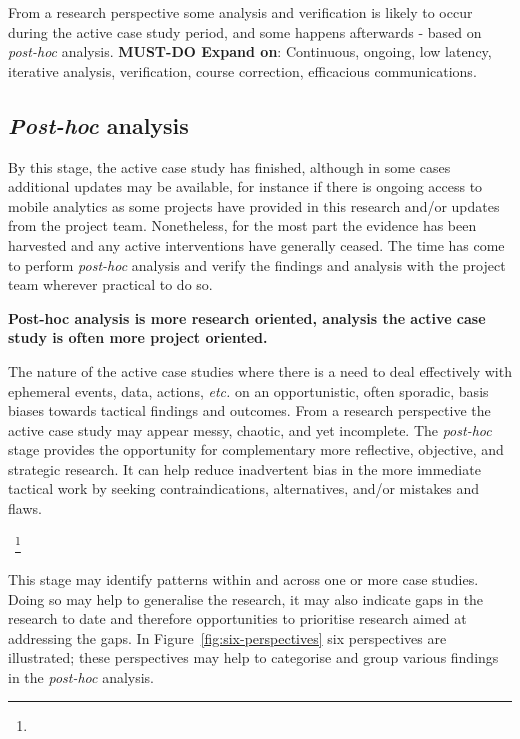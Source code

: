 
From a research perspective some analysis and verification is likely to occur during the active case study period, and some happens afterwards - based on \emph{post-hoc} analysis. \textbf{MUST-DO Expand on}: Continuous, ongoing, low latency, iterative analysis, verification, course correction, efficacious communications. 

\subsection{\emph{Post-hoc} analysis}
By this stage, the active case study has finished, although in some cases additional updates may be available, for instance if there is ongoing access to mobile analytics as some projects have provided in this research and/or updates from the project team. Nonetheless, for the most part the evidence has been harvested and any active interventions have generally ceased. The time has come to perform \emph{post-hoc} analysis and verify the findings and analysis with the project team wherever practical to do so. 

\textbf{Post-hoc analysis is more research oriented, analysis the active case study is often more project oriented.} 

The nature of the active case studies where there is a need to deal effectively with ephemeral events, data, actions, \textit{etc.} on an opportunistic, often sporadic, basis biases towards tactical findings and outcomes. From a research perspective the active case study may appear messy, chaotic, and yet incomplete. 
The \textit{post-hoc} stage provides the opportunity for complementary more reflective, objective, and strategic research. It can help reduce inadvertent bias in the more immediate tactical work by seeking contraindications, alternatives, and/or mistakes and flaws.

~\footnote{}

This stage may identify patterns within and across one or more case studies. Doing so may help to generalise the research, it may also indicate gaps in the research to date and therefore opportunities to prioritise research aimed at addressing the gaps.
In Figure~\ref{fig:six-perspectives} six perspectives are illustrated; these perspectives may help to categorise and group various findings in the \textit{post-hoc} analysis. 

